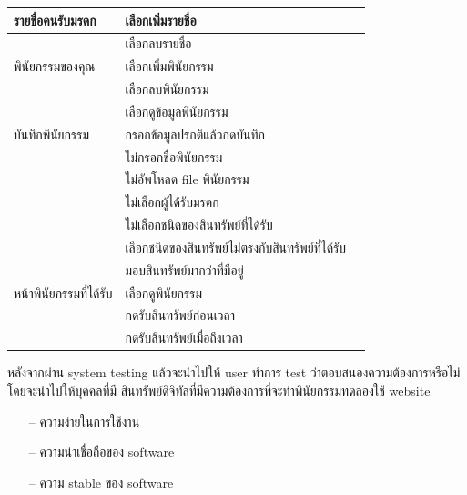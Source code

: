 \documentclass[12pt,oneside,openright,a4paper]{cpe-thai-project}
\begin{document}
\begin{enumerate}[label=\thesection.\arabic*,leftmargin=0pt,itemindent=1.25cm]
\begin{table}[h]
\begin{tabular}{|l|l|l|}
รายชื่อคนรับมรดก       & เลือกเพิ่มรายชื่อ                                &        \\ \hline
                       & เลือกลบรายชื่อ                                   &        \\ \hline
พินัยกรรมของคุณ        & เลือกเพิ่มพินัยกรรม                              &        \\ \hline
                       & เลือกลบพินัยกรรม                                 &        \\ \hline
                       & เลือกดูข้อมูลพินัยกรรม                           &        \\ \hline
บันทึกพินัยกรรม        & กรอกข้อมูลปรกติแล้วกดบันทึก                      &        \\ \hline
                       & ไม่กรอกชื่อพินัยกรรม                             &        \\ \hline
                       & ไม่อัพโหลด file พินัยกรรม                        &        \\ \hline
                       & ไม่เลือกผู้ได้รับมรดก                            &        \\ \hline
                       & ไม่เลือกชนิดของสินทรัพย์ที่ได้รับ                &        \\ \hline
                       & เลือกชนิดของสินทรัพย์ไม่ตรงกับสินทรัพย์ที่ได้รับ &        \\ \hline
                       & มอบสินทรัพย์มากว่าที่มีอยู่                      &        \\ \hline
หน้าพินัยกรรมที่ได้รับ & เลือกดูพินัยกรรม                                 &        \\ \hline
                       & กดรับสินทรัพย์ก่อนเวลา                           &        \\ \hline
                       & กดรับสินทรัพย์เมื่อถึงเวลา                       &        \\ \hline
\end{tabular}
\end{table}
\end{enumerate}

\tab หลังจากผ่าน system testing แล้วจะนำไปให้ user ทำการ test ว่าตอบสนองความต้องการหรือไม่ โดยจะนำไปให้บุคคลที่มี สินทรัพย์ดิจิทัลที่มีความต้องการที่จะทำพินัยกรรมทดลองใช้ website

\begin{itemize}
	\item[--] ความง่ายในการใช้งาน
\item[--]  ความน่าเชื่อถือของ software
\item[--]  ความ stable ของ software
\end{itemize}
\end{document}
